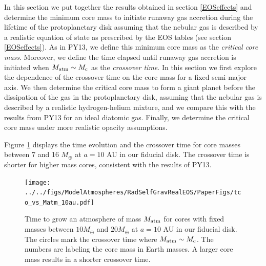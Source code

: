 \documentclass[apj]{emulateapj}
\newcommand{\co}{_{\rm c}}
\begin{document}


In this section we put together the results obtained in section \ref{EOSeffects} and determine the minimum core mass to initiate runaway gas accretion during the lifetime of the protoplanetary disk assuming that the nebular gas is described by a realistic equation of state as prescribed by the \citet{saumon95} EOS tables (see section \ref{EOSeffects}). As in PY13, we define this minimum core mass as the \textit{critical core mass}. Moreover, we define the time elapsed until runaway gas accretion is initiated when $M_{\rm{atm}} \sim M\co$ as the \textit{crossover time}. In this section we first explore the dependence of the crossover time on the core mass for a fixed semi-major axis. We then determine the critical core mass to form a giant planet before the dissipation of the gas in the protoplanetary disk, assuming that the nebular gas is described by a realistic hydrogen-helium mixture, and we compare this with the results from PY13 for an ideal diatomic gas. Finally, we determine the critical core mass under more realistic opacity assumptions.



Figure \ref{fig:tvsMplot} displays the time evolution and the crossover time for core masses between 7 and 16 $M_{\oplus}$ at $a=10$ AU in our fiducial disk. The crossover time is shorter for higher mass cores, consistent with the results of PY13. 

\begin{figure}[h!]
\centering
\texttt{[image: ../../figs/ModelAtmospheres/RadSelfGravRealEOS/PaperFigs/tco\_vs\_Matm\_10au.pdf]}
\caption{Time to grow an atmosphere of mass $M_{\rm{atm}}$ for cores with fixed masses between $10 M_{\oplus}$ and $20 M_{\oplus}$ at $a=10$ AU in our fiducial disk. The circles mark the crossover time where $M_{\rm{atm}} \sim M_{\rm c}$. The numbers are labeling the core mass in Earth masses. A larger core mass results in a shorter crossover time.}
\label{fig:tvsMplot}
\end{figure}
\end{document}

